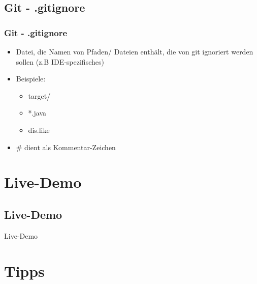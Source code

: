 \documentclass[18pt]{beamer}
\begin{document}
	\subsection{Git - .gitignore}
	\begin{frame}
		\frametitle{Git - .gitignore}
		\begin{itemize}
			\item Datei, die Namen von Pfaden/ Dateien enthält, die von git ignoriert werden sollen (z.B IDE-spezifisches)
			\item Beispiele: 
			\begin{itemize}
				\item target/
				\item *.java
				\item dis.like
			\end{itemize}
			\item \# dient als Kommentar-Zeichen
		\end{itemize}
	\end{frame}
		
\section{Live-Demo}		
	\subsection{Live-Demo}
	\begin{frame}
		\centering Live-Demo
	\end{frame}
		
\section{Tipps}
\end{document}
